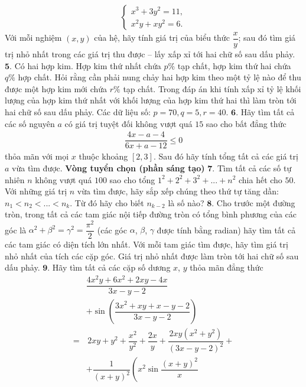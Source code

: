 \begin{multicols}{2}
\begin{align*}
\begin{cases}
			x^3 + 3y^2 = 11,\\
			x^2y + xy^2 = 6.
		\end{cases}
	\end{align*}
	Với mỗi nghiệm $(x,y)$ của hệ, hãy tính giá trị của biểu thức $\dfrac{x}{y}$; sau đó tìm giá trị nhỏ nhất trong các giá trị thu được -- lấy xấp xỉ tới hai chữ số sau dấu phảy.
	\vskip 0.1cm
	$\pmb{5.}$ Có hai hợp kim. Hợp kim thứ nhất chứa $p\%$ tạp chất, hợp kim thứ hai chứa $q\%$ hợp chất. Hỏi rằng cần phải nung chảy hai hợp kim theo một tỷ lệ nào để thu được một hợp kim mới chứa $r\%$ tạp chất. Trong đáp án khi tính xấp xỉ tỷ lệ khối lượng của hợp kim thứ nhất với khối lượng của hợp kim thứ hai thì làm tròn tới hai chữ số sau dấu phảy.
	\vskip 0.1cm
	Các dữ liệu số: $p = 70, q = 5, r = 40$.
	\vskip 0.1cm
	$\pmb{6.}$ Hãy tìm tất cả các số nguyên $a$ có giá trị tuyệt đối không vượt quá $15$ sao cho bất đẳng thức 
	\begin{align*}
		\dfrac{{4x - a - 4}}{{6x + a - 12}} \le 0
	\end{align*}
	thỏa mãn với mọi $x$ thuộc khoảng  $[2,3]$. Sau đó hãy tính tổng tất cả các giá trị $a$ vừa tìm được.
	\vskip 0.1cm
	\textbf{\color{cackithi}Vòng tuyển chọn (phần sáng tạo)}
	\vskip 0.1cm
	$\pmb{7.}$ Tìm tất cả các số tự nhiên $n$ không vượt quá $100$ sao cho tổng ${1^2} + {2^2} + {3^2} + ... + {n^2}$  chia hết cho $50$.
	\vskip 0.1cm
	Với những giá trị $n$ vừa tìm được, hãy sắp xếp chúng theo thứ tự tăng dần:  ${n_1} < {n_2} < ... < {n_k}$. Từ đó hãy cho biết $n_{k-2}$ là số nào?
	\vskip 0.1cm
	$\pmb{8.}$ Cho trước một đường tròn, trong tất cả các tam giác nội tiếp đường tròn có tổng bình phương của các góc là $\alpha^2 + \beta^2 = \gamma^2 = \dfrac{\pi^2}{2}$ (các góc  $\alpha$,  $\beta$, $\gamma$ được tính bằng radian) hãy tìm tất cả các tam giác có diện tích lớn nhất.
	\vskip 0.1cm
	Với mỗi tam giác tìm được, hãy tìm giá trị nhỏ nhất của tích các cặp góc. Giá trị nhỏ nhất được làm tròn tới hai chữ số sau dấu phảy. 
	\vskip 0.1cm
	$\pmb{9.}$ Hãy tìm tất cả các cặp số dương $x$, $y$ thỏa mãn đẳng thức
	\begin{align*}
		&\dfrac{{4{x^2}y + 6{x^2} + 2xy - 4x}}{{3x - y - 2}} \\
		&+ \sin \left( {\dfrac{{3{x^2} + xy + x - y - 2}}{{3x - y - 2}}} \right)\\
		= &\,2xy + {y^2} + \dfrac{{{x^2}}}{{{y^2}}} + \dfrac{{2x}}{y} + \dfrac{{2xy({x^2} + {y^2})}}{{{{(3x - y - 2)}^2}}} + \\
		&+ \dfrac{1}{{{{(x + y)}^2}}}\left( {x^2}\sin \dfrac{{{{(x + y)}^2}}}{x}\right. \\

\end{align*}
\end{multicols}
